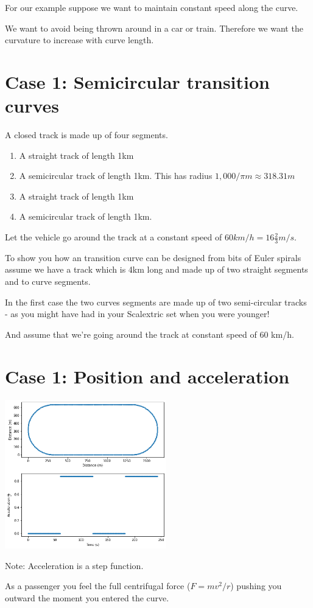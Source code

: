 \documentclass[12pt]{article} %
\theoremstyle{definition}
\theoremstyle{theorem}
\begin{document}
For our example suppose we want to maintain constant speed along the curve.

We want to avoid being thrown around in a car or train. Therefore we want the curvature to increase with curve length.

\section{Case 1: Semicircular transition curves}
\begin{tcolorbox}
	A closed  track is made up of four segments.
	\begin{enumerate}
		\item A straight track of length 1km
		\item A semicircular track of length 1km. This has radius $1,000 / \pi m \approx 318.31m$
		\item A straight track of length 1km
		\item A semicircular track of length 1km.
	\end{enumerate}
	Let the vehicle go around the track at a constant speed of $60 km/h = 16 \frac{2}{3} m/s$.
\end{tcolorbox}

To show you how an transition curve can be designed from bits of Euler spirals assume we have a track which is 4km long and made up of two straight segments and to curve segments. 

In the first case the two curves segments are made up of two semi-circular tracks - as you might have had in your Scalextric set when you were younger!

And assume that we're going around the track at constant speed of 60 km/h.

\section{Case 1: Position and acceleration}
\begin{tcolorbox}
	\begin{minipage}{\linewidth}
		\centering
		\includegraphics[width=70mm, scale=0.2]{circular_track.png}
	\end{minipage}
	Note: Acceleration is a step function. 
	
	As a passenger you feel the full centrifugal force ($F=mv^2/r$) pushing you outward the moment you entered the curve. 		
\end{tcolorbox}
\end{document}
